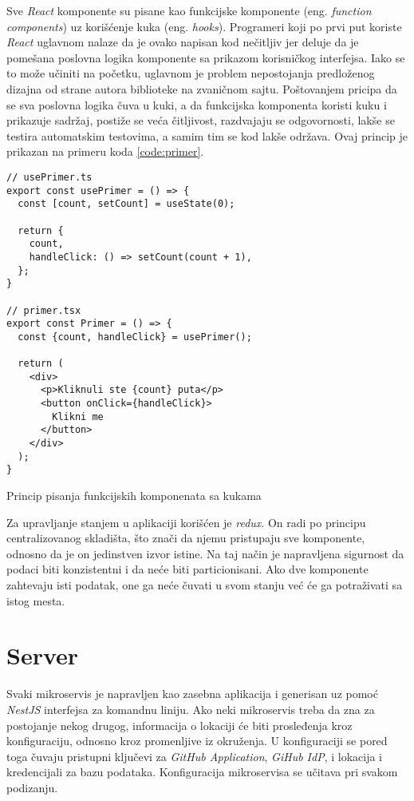 Sve \textit{React} komponente su pisane kao funkcijske komponente 
(eng. \textit{function components}) uz korišćenje kuka (eng. \textit{hooks}).
Programeri koji po prvi put koriste \textit{React} uglavnom nalaze da je 
ovako napisan kod nečitljiv jer deluje da je pomešana poslovna logika komponente 
sa prikazom korisničkog interfejsa. %
Iako se to može učiniti na početku, uglavnom je 
problem nepostojanja predloženog dizajna od strane autora biblioteke na 
zvaničnom sajtu. Poštovanjem pricipa da se sva poslovna logika %
čuva u kuki, a da funkcijska komponenta koristi kuku i prikazuje sadržaj, 
postiže se veća čitljivost, razdvajaju se odgovornosti, lakše se testira 
automatskim testovima, a samim tim se kod lakše održava. 
Ovaj princip je prikazan na primeru koda \ref{code:primer}.
\begin{listing}[H]
  \centering
\begin{verbatim}
// usePrimer.ts
export const usePrimer = () => {
  const [count, setCount] = useState(0);

  return {
    count,
    handleClick: () => setCount(count + 1),
  };
}

// primer.tsx
export const Primer = () => {
  const {count, handleClick} = usePrimer();

  return (
    <div>
      <p>Kliknuli ste {count} puta</p>
      <button onClick={handleClick}>
        Klikni me
      </button>
    </div>
  );
}
\end{verbatim}
\caption{Princip pisanja funkcijskih komponenata sa kukama}
\label{code:primer}
\end{listing}

Za upravljanje stanjem u aplikaciji korišćen je \textit{redux}. On radi 
po principu centralizovanog skladišta, što znači da njemu pristupaju sve 
komponente, odnosno da je on jedinstven %
izvor istine. Na taj način je 
napravljena sigurnost da podaci biti konzistentni i da neće biti particionisani.
Ako dve komponente zahtevaju isti podatak, one ga neće čuvati u svom stanju 
već će ga potraživati sa istog mesta.

\section{Server}
Svaki mikroservis je napravljen kao zasebna aplikacija i generisan uz pomoć 
\textit{NestJS} interfejsa za komandnu liniju. Ako neki mikroservis treba 
da zna za postojanje nekog drugog, informacija o lokaciji će biti prosleđenja 
kroz konfiguraciju, odnosno kroz promenljive iz okruženja. U konfiguraciji 
se pored toga čuvaju pristupni ključevi za \textit{GitHub Application}, 
\textit{GiHub IdP}, i lokacija i kredencijali za bazu podataka. Konfiguracija 
mikroservisa se učitava pri svakom podizanju.

